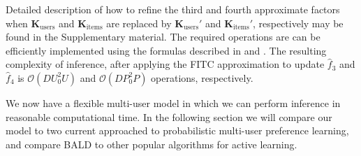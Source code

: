 Detailed description of how to refine the third and fourth approximate factors when $\mathbf{K}_\text{users}$ and
$\mathbf{K}_\text{items}$ are replaced by $\mathbf{K}_\text{users}'$ and $\mathbf{K}_\text{items}'$, respectively may be found in the Supplementary material.
The required operations are can be efficiently implemented using the formulas
described in \citep{Guzman2007} and \citep{Lazaro2010}.
The resulting complexity of inference, after applying the FITC approximation to update $\hat{f}_3$ and $\hat{f}_4$ is $\mathcal{O}(DU_0^2U)$ and $\mathcal{O}(DP_0^2P)$ operations, respectively.

We now have a flexible multi-user model in which we can perform inference in reasonable computational time. In the following section we will compare our model to two current approached to probabilistic multi-user preference learning, and compare BALD to other popular algorithms for active learning.
